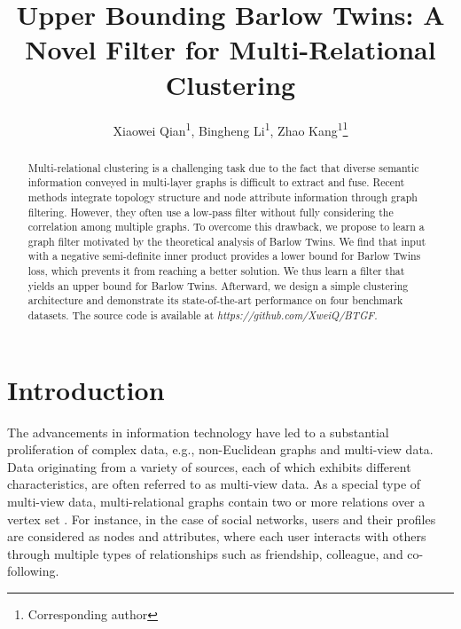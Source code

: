 \documentclass[letterpaper]{article} %
\title{Upper Bounding Barlow Twins: A Novel Filter for Multi-Relational Clustering}
\author{
    Xiaowei Qian\textsuperscript{\rm 1}\equalcontrib,
    Bingheng Li\textsuperscript{\rm 1}\equalcontrib,
    Zhao Kang\textsuperscript{\rm 1}\footnote{Corresponding author}
}
\begin{document}
\maketitle

\begin{abstract}
Multi-relational clustering is a challenging task due to the fact that diverse semantic information conveyed in multi-layer graphs is difficult to extract and fuse. Recent methods integrate topology structure and node attribute information through graph filtering. However, they often use a low-pass filter without fully considering the correlation among multiple graphs. To overcome this drawback, we propose to learn a graph filter motivated by the theoretical analysis of Barlow Twins. We find that input with a negative semi-definite inner product provides a lower bound for Barlow Twins loss, which prevents it from reaching a better solution. We thus learn a filter that yields an upper bound for Barlow Twins. Afterward, we design a simple clustering architecture and demonstrate its state-of-the-art performance on four benchmark datasets. The source code is available at \textit{https://github.com/XweiQ/BTGF.}
\end{abstract}

\section{Introduction}
The advancements in information technology have led to a substantial proliferation of complex data, e.g., non-Euclidean graphs and multi-view data. Data originating from a variety of sources, each of which exhibits different characteristics, are often referred to as multi-view data. As a special type of multi-view data, multi-relational graphs contain two or more relations over a vertex set \cite{qu2017attention}. For instance, in the case of social networks, users and their profiles are considered as nodes and attributes, where each user interacts with others through multiple types of relationships such as friendship, colleague, and co-following.
\end{document}
